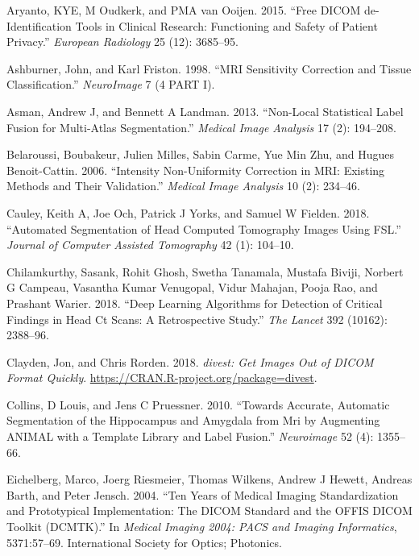 \documentclass[]{elsarticle} %
\begin{document}
\leavevmode\hypertarget{ref-aryanto2015free}{}%
Aryanto, KYE, M Oudkerk, and PMA van Ooijen. 2015. ``Free DICOM de-Identification Tools in Clinical Research: Functioning and Safety of Patient Privacy.'' \emph{European Radiology} 25 (12): 3685--95.

\leavevmode\hypertarget{ref-ashburner1998mri}{}%
Ashburner, John, and Karl Friston. 1998. ``MRI Sensitivity Correction and Tissue Classification.'' \emph{NeuroImage} 7 (4 PART I).

\leavevmode\hypertarget{ref-asman2013non}{}%
Asman, Andrew J, and Bennett A Landman. 2013. ``Non-Local Statistical Label Fusion for Multi-Atlas Segmentation.'' \emph{Medical Image Analysis} 17 (2): 194--208.

\leavevmode\hypertarget{ref-belaroussi2006intensity}{}%
Belaroussi, Boubakeur, Julien Milles, Sabin Carme, Yue Min Zhu, and Hugues Benoit-Cattin. 2006. ``Intensity Non-Uniformity Correction in MRI: Existing Methods and Their Validation.'' \emph{Medical Image Analysis} 10 (2): 234--46.

\leavevmode\hypertarget{ref-biasct}{}%
Cauley, Keith A, Joe Och, Patrick J Yorks, and Samuel W Fielden. 2018. ``Automated Segmentation of Head Computed Tomography Images Using FSL.'' \emph{Journal of Computer Assisted Tomography} 42 (1): 104--10.

\leavevmode\hypertarget{ref-cq500}{}%
Chilamkurthy, Sasank, Rohit Ghosh, Swetha Tanamala, Mustafa Biviji, Norbert G Campeau, Vasantha Kumar Venugopal, Vidur Mahajan, Pooja Rao, and Prashant Warier. 2018. ``Deep Learning Algorithms for Detection of Critical Findings in Head Ct Scans: A Retrospective Study.'' \emph{The Lancet} 392 (10162): 2388--96.

\leavevmode\hypertarget{ref-divest}{}%
Clayden, Jon, and Chris Rorden. 2018. \emph{divest: Get Images Out of DICOM Format Quickly}. \url{https://CRAN.R-project.org/package=divest}.

\leavevmode\hypertarget{ref-collins2010towards}{}%
Collins, D Louis, and Jens C Pruessner. 2010. ``Towards Accurate, Automatic Segmentation of the Hippocampus and Amygdala from Mri by Augmenting ANIMAL with a Template Library and Label Fusion.'' \emph{Neuroimage} 52 (4): 1355--66.

\leavevmode\hypertarget{ref-dcmtk}{}%
Eichelberg, Marco, Joerg Riesmeier, Thomas Wilkens, Andrew J Hewett, Andreas Barth, and Peter Jensch. 2004. ``Ten Years of Medical Imaging Standardization and Prototypical Implementation: The DICOM Standard and the OFFIS DICOM Toolkit (DCMTK).'' In \emph{Medical Imaging 2004: PACS and Imaging Informatics}, 5371:57--69. International Society for Optics; Photonics.
\end{document}
